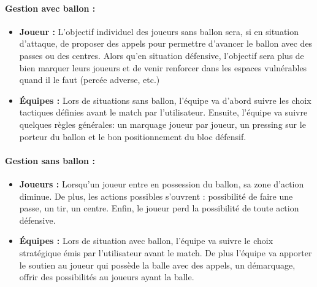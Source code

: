 \vspace{10pt}

\paragraph{Gestion avec ballon :}

\begin{itemize}
    \item \textbf{Joueur :} L’objectif individuel des joueurs sans ballon sera, si en situation d’attaque, de proposer des appels pour permettre d’avancer le ballon avec des passes ou des centres. Alors qu’en situation défensive, l’objectif sera plus de bien marquer leurs joueurs et de venir renforcer dans les espaces vulnérables quand il le faut (percée adverse, etc.)

    \vspace{10pt}

    \item \textbf{Équipes :} Lors de situations sans ballon, l'équipe va d’abord suivre les choix tactiques définies avant le match par l’utilisateur. Ensuite, l'équipe va suivre quelques règles générales: un marquage joueur par joueur, un pressing sur le porteur du ballon et le bon positionnement du bloc défensif.
\end{itemize}

\vspace{10pt}

\paragraph{Gestion sans ballon :}
\begin{itemize}
    \item \textbf{Joueurs :} Lorsqu’un joueur entre en possession du ballon, sa zone d’action diminue. De plus, les actions possibles s’ouvrent : possibilité de faire une passe, un tir, un centre. Enfin, le joueur perd la possibilité de toute action défensive.

    \vspace{10pt}

    \item \textbf{Équipes :} Lors de situation avec ballon, l'équipe va suivre le choix stratégique émis par l’utilisateur avant le match. De plus l’équipe va apporter le soutien au joueur qui possède la balle avec des appels, un démarquage, offrir des possibilités au joueurs ayant la balle.
\end{itemize}

